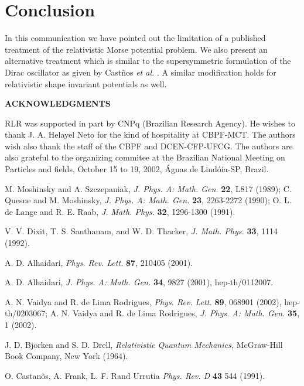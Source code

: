 \documentclass[a4paper,dvips,12pt]{article}
\begin{document}
\section{Conclusion}

In this communication we have pointed out the limitation
of a published treatment of the relativistic Morse potential
problem. We also present an alternative treatment which is similar to
the supersymmetric formulation of the Dirac oscillator as given
by Cast\~nos {\it et al.} \cite{Cas91}.
A similar modification holds for relativistic shape invariant
potentials as well.

\vspace{1cm}
\centerline{\bf ACKNOWLEDGMENTS}

RLR was supported in part by CNPq (Brazilian Research Agency). He wishes to
thank J. A. Helayel Neto for the kind of hospitality at CBPF-MCT. The
authors wish also thank the staff of the CBPF and DCEN-CFP-UFCG. The
authors are also grateful to the organizing commitee at the
 Brazilian National Meeting on Particles and fields,
October 15 to 19, 2002, \'Aguas de Lind\'oia-SP, Brazil.


\begin{thebibliography}{99}

 M. Moshinsky and A. Szczepaniak,
{\it J. Phys. A: Math. Gen.} {\bf 22}, L817 (1989);
C. Quesne and M. Moshinsky,
{\it J. Phys. A: Math. Gen.} {\bf 23}, 2263-2272 (1990);
 O. L. de Lange and R. E. Raab,
{\it J. Math. Phys.} {\bf 32}, 1296-1300 (1991).

 V. V. Dixit, T. S. Santhanam, and W. D. Thacker,
{\it J. Math. Phys.} {\bf 33}, 1114 (1992).



 A. D. Alhaidari, {\it Phys. Rev. Lett.} {\bf 87},
210405 (2001).



  A. D. Alhaidari,
{\it J. Phys. A: Math. Gen.} {\bf 34}, 9827 (2001), hep-th/0112007.


 A. N.
Vaidya and R. de Lima Rodrigues, {\it Phys. Rev. Lett.} {\bf 89},
 068901 (2002), hep-th/0203067;
A. N.
Vaidya and R. de Lima Rodrigues, {\it J. Phys. A: Math. Gen.} {\bf 35}, 1
(2002).

 J. D. Bjorken and S. D. Drell, {\it Relativistic Quantum
Mechanics,} McGraw-Hill Book Company, New York (1964).


 O. Castan\~os, A. Frank, L. F. Rand Urrutia
{\it Phys. Rev. D} {\bf 43} 544 (1991).


\end{thebibliography}
\end{document}
